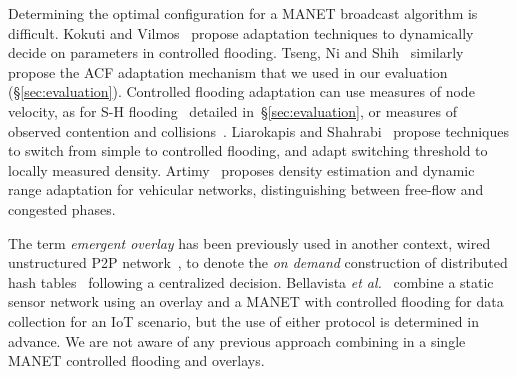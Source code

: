 Determining the optimal configuration for a MANET broadcast algorithm is difficult.
Kokuti and Vilmos~\citep{kokuti2012adaptive} propose adaptation techniques to dynamically decide on parameters in controlled flooding.
Tseng, Ni and Shih~\citep{2001:AAR:876878.879323} similarly propose the ACF adaptation mechanism that we used in our evaluation (\S\ref{sec:evaluation}).
Controlled flooding adaptation can use measures of node velocity, as for S-H flooding~\citep{adaptive_group_com_iscc02} detailed in~\S\ref{sec:evaluation}, or measures of observed contention and collisions~\citep{2001:AAR:876878.879323}.
Liarokapis and Shahrabi~\citep{prob-based-adaptive-tech} propose techniques to switch from simple to controlled flooding, and adapt switching threshold to locally measured density.
Artimy~\citep{artimy2007local} proposes density estimation and dynamic range adaptation for vehicular networks, distinguishing between free-flow and congested phases.

The term \emph{emergent overlay} has been previously used in another context, wired unstructured P2P network~\citep{galuba2007generic}, to denote the \emph{on demand} construction of distributed hash tables~\citep{jelasity2009t} following a centralized decision.
Bellavista \emph{et al.}~\citep{Bellavista2013} combine a static sensor network using an overlay and a MANET with controlled flooding for data collection for an IoT scenario, but the use of either protocol is determined in advance.
We are not aware of any previous approach combining in a single MANET controlled flooding and overlays.


